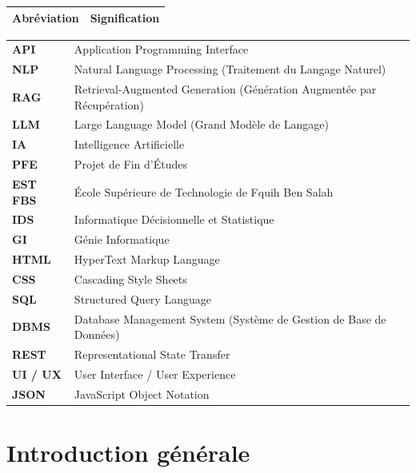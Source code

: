 \documentclass[12pt, a4paper, twoside]{report}
\begin{document}
\begin{longtable}{ll}
\toprule
\rowcolor{primary}\textbf{\color{white}Abréviation} & \textbf{\color{white}Signification} \\ 
\midrule
\end{longtable}
\vspace{-1.5cm}
\begin{tabularx}{\textwidth}{>{\bfseries\color{primary}}l X}
\rowcolor{lightgray} API & Application Programming Interface \\
\rowcolor{white} NLP & Natural Language Processing (Traitement du Langage Naturel) \\
\rowcolor{lightgray} RAG & Retrieval-Augmented Generation (Génération Augmentée par Récupération) \\
\rowcolor{white} LLM & Large Language Model (Grand Modèle de Langage) \\
\rowcolor{lightgray} IA & Intelligence Artificielle \\
\rowcolor{white} PFE & Projet de Fin d'Études \\
\rowcolor{lightgray} EST FBS & École Supérieure de Technologie de Fquih Ben Salah \\
\rowcolor{white} IDS & Informatique Décisionnelle et Statistique \\
\rowcolor{lightgray} GI & Génie Informatique \\
\rowcolor{white} HTML & HyperText Markup Language \\
\rowcolor{lightgray} CSS & Cascading Style Sheets \\
\rowcolor{white} SQL & Structured Query Language \\
\rowcolor{lightgray} DBMS & Database Management System (Système de Gestion de Base de Données) \\
\rowcolor{white} REST & Representational State Transfer \\
\rowcolor{lightgray} UI / UX & User Interface / User Experience \\
\rowcolor{white} JSON & JavaScript Object Notation \\
\bottomrule

\end{tabularx}


\newpage

\listoffigures
\newpage

\tableofcontents
\newpage


\chapter{Introduction générale}
\end{document}
